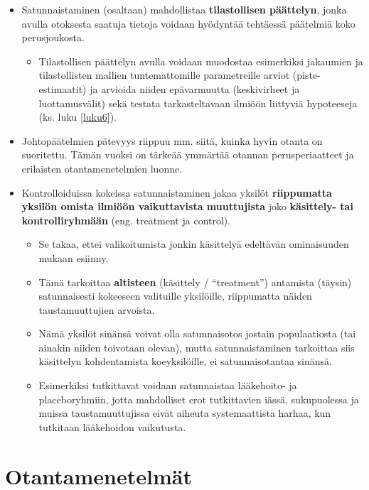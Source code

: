\documentclass[
]{book}
\providecommand{\tightlist}{%
  \setlength{\itemsep}{0pt}\setlength{\parskip}{0pt}}
\begin{document}
\begin{itemize}
\item
  Satunnaistaminen (osaltaan) mahdollistaa \textbf{tilastollisen päättelyn}, jonka avulla otoksesta saatuja tietoja voidaan hyödyntää tehtäessä päätelmiä koko perusjoukosta.

  \begin{itemize}
  \tightlist
  \item
    Tilastollisen päättelyn avulla voidaan muodostaa esimerkiksi jakaumien ja tilastollisten mallien tuntemattomille parametreille arviot (piste-estimaatit) ja arvioida niiden epävarmuutta (keskivirheet ja luottamusvälit) sekä testata tarkasteltavaan ilmiöön liittyviä hypoteeseja (ks. luku \ref{luku6}).
  \end{itemize}
\item
  Johtopäätelmien pätevyys riippuu mm. siitä, kuinka hyvin otanta on suoritettu. Tämän vuoksi on tärkeää ymmärtää otannan perusperiaatteet ja erilaisten otantamenetelmien luonne.
\item
  Kontrolloiduissa kokeissa satunnaistaminen jakaa yksilöt \textbf{riippumatta yksilön omista ilmiöön vaikuttavista muuttujista} joko \textbf{käsittely- tai kontrolliryhmään} (eng. treatment ja control).

  \begin{itemize}
  \tightlist
  \item
    Se takaa, ettei valikoitumista jonkin käsittelyä edeltävän ominaisuuden mukaan esiinny.
  \item
    Tämä tarkoittaa \textbf{altisteen} (käsittely / ``treatment'') antamista (täysin) satunnaisesti kokeeseen valituille yksilöille, riippumatta näiden taustamuuttujien arvoista.
  \item
    Nämä yksilöt sinänsä voivat olla satunnaisotos jostain populaatiosta (tai ainakin niiden toivotaan olevan), mutta satunnaistaminen tarkoittaa siis käsittelyn kohdentamista koeyksilöille, ei satunnaisotantaa sinänsä.
  \item
    Esimerkiksi tutkittavat voidaan satunnaistaa lääkehoito- ja placeboryhmiin, jotta mahdolliset erot tutkittavien iässä, sukupuolessa ja muissa taustamuuttujissa eivät aiheuta systemaattista harhaa, kun tutkitaan lääkehoidon vaikutusta.
  \end{itemize}
\end{itemize}

\hypertarget{alaluku55}{%
\section{Otantamenetelmät}\label{alaluku55}}
\end{document}

